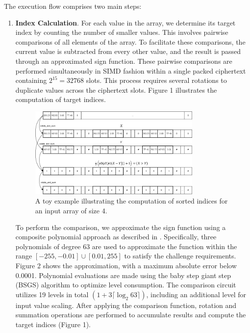 \documentclass[article]{iacrtrans}
\begin{document}
The execution flow comprises two main steps:
\begin{enumerate}
    \item \textbf{Index Calculation}.
        For each value in the array, we determine its target index by counting the number of smaller values. This involves pairwise comparisons of all elements of the array. To facilitate these comparisons, the current value is subtracted from every other value, and the result is passed through an approximated sign function. These pairwise comparisons are performed simultaneously in SIMD fashion within a single packed ciphertext containing $2^{15} = 32768$ slots. This process requires several rotations to duplicate values across the ciphertext slots. Figure 1 illustrates the computation of target indices.

        \begin{figure}[H]
            \centering
            \includegraphics[width=0.8\textwidth]{array sorting figures/fig_1.png}
            \caption{A toy example illustrating the computation of sorted indices for an input array of size 4.}
            \label{fig:sorting-1}
        \end{figure}
        
        To perform the comparison, we approximate the sign function using a composite polynomial approach as described in \cite{Lee2021}. Specifically, three polynomials of degree 63 are used to approximate the function within the range $[-255, -0.01] \cup [0.01, 255]$ to satisfy the challenge requirements. Figure 2 shows the approximation, with a maximum absolute error below 0.0001. Polynomial evaluations are made using the baby step giant step (BSGS) algorithm \cite{Bossuat2021} to optimize level consumption. The comparison circuit utilizes 19 levels in total $(1+3\lceil \log_{2}63 \rceil)$, including an additional level for input value scaling. After applying the comparison function, rotation and summation operations are performed to accumulate results and compute the target indices (Figure 1).
        

\end{enumerate}
\end{document}
